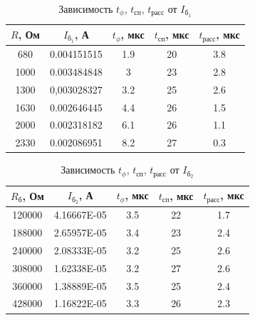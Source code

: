 
\begin{table}[H]
	\begin{center}
	\caption{Зависимость $t_\phi$, $t_\text{сп}$, $t_\text{расс}$ от $I_{\text{б}_1}$}
		\begin{tabular}{|c|c|c|c|c|}
		\hline 
		$R$, Ом & $I_{\text{б}_1}$, А & $t_\phi$, мкс & $t_\text{сп}$, мкс & $t_\text{расс}$, мкс \\ 
		\hline 
		680	& 0.004151515 &	1.9 & 20 & 3.8 \\
		\hline
		1000 & 0.003484848 & 3 & 23 & 2.8 \\
		\hline
		1300 &	0,003028327 & 3.2 &	25 & 2.6 \\ 
		\hline
		1630 & 0.002646445 & 4.4 & 26 &	1.5 \\
		\hline
		2000 &	0.002318182 & 6.1 &	26 & 1.1 \\
		\hline
		2330 & 0.002086951 & 8.2 & 27 & 0.3 \\
		\hline
		\end{tabular} 
		\label{tabular:3}
	\end{center}
\end{table}


\begin{table}[H]
	\begin{center}
	\caption{Зависимость $t_\phi$, $t_\text{сп}$, $t_\text{расс}$ от $I_{\text{б}_2}$}
		\begin{tabular}{|c|c|c|c|c|}
		\hline 
		$R_\text{б}$, Ом & $I_{\text{б}_2}$, А & $t_\phi$, мкс & $t_\text{сп}$, мкс & $t_\text{расс}$, мкс \\ 
		\hline 
		120000 & 4.16667E-05 & 3.5 & 22 & 1.7 \\
		\hline
		188000 & 2.65957E-05 & 3.4 & 23 & 2.4 \\
		\hline
		240000 & 2.08333E-05 & 3.2 & 25	& 2.6 \\
		\hline
		308000 & 1.62338E-05 & 3.2 & 27 & 2.6 \\
		\hline
		360000 & 1.38889E-05 & 3.5 & 25 & 2.4 \\
		\hline
		428000 & 1.16822E-05 & 3.3 & 26 & 2.3 \\
		\hline
		\end{tabular} 
		\label{tabular:4}
	\end{center}
\end{table}


